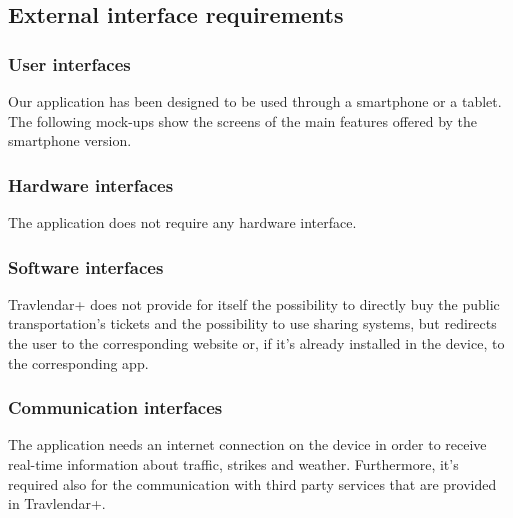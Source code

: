 \documentclass[12pt,titlepage]{article}
\begin{document}
\subsection{External interface requirements}\label{sec:mod1}
\subsubsection{User interfaces}\label{sec:mod1}
Our application has been designed to be used through a smartphone or a tablet.
The following mock-ups show the screens of the main features offered by the smartphone version. 



\subsubsection{Hardware interfaces}\label{sec:mod1}
The application does not require any hardware interface. 

\subsubsection{Software interfaces}\label{sec:mod1}
Travlendar+ does not provide for itself the possibility to directly buy the public transportation's tickets and the possibility to use sharing systems, but redirects the user to the corresponding website or, if it's already installed in the device, to the corresponding app.

\subsubsection{Communication interfaces}\label{sec:mod1}
The application needs an internet connection on the device in order to receive real-time information about traffic, strikes and weather. Furthermore, it's required also for the communication with third party services that are provided in Travlendar+. 
\end{document}
